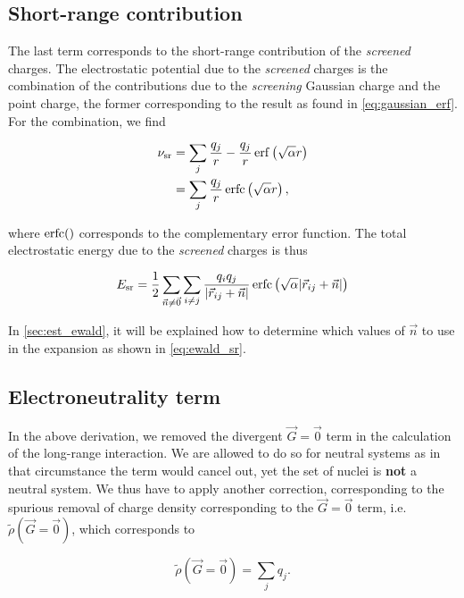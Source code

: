 %
%
%
\subsection{Short-range contribution}

The last term corresponds to the short-range contribution of the \textit{screened} charges. The electrostatic potential due to the \textit{screened} charges is the combination of the contributions due to the \textit{screening} Gaussian charge and the point charge, the former corresponding to the result as found in \cref{eq:gaussian_erf}. For the combination, we find

\begin{align}
    \nu_{\text{sr}} &= \sum_{j} \frac{q_{j}}{r} - \frac{q_{j}}{r} \operatorname{erf} \left( \sqrt{\alpha} r \right) \\
    &= \sum_{j} \frac{q_{j}}{r} \operatorname{erfc} \left( \sqrt{\alpha} r \right),
    \label{eq:nu_shortrange}
\end{align}

where $\operatorname{erfc}()$ corresponds to the complementary error function. The total electrostatic energy due to the \textit{screened} charges is thus

\begin{equation}
    E_{\text{sr}} = \frac{1}{2} \sum_{\vec{n} \neq \vec{0}} \sum_{i \neq j} \frac{q_{i}q_{j}}{|\vec{r}_{ij} + \vec{n}|} \operatorname{erfc} \left( 
\sqrt{\alpha} |\vec{r}_{ij} + \vec{n}| \right)
\label{eq:ewald_sr}
\end{equation}

In \cref{sec:est_ewald}, it will be explained how to determine which values of $\vec{n}$ to use in the expansion as shown in \cref{eq:ewald_sr}.

%
%
%
\subsection{Electroneutrality term}
\label{sec:electroneutrality}

In the above derivation, we removed the divergent $\vec{G}=\vec{0}$ term in the calculation of the long-range interaction. We are allowed to do so for neutral systems as in that circumstance the term would cancel out, yet the set of nuclei is \textbf{not} a neutral system. We thus have to apply another correction, corresponding to the spurious removal of charge density corresponding to the $\vec{G}=\vec{0}$ term, i.e. $\tilde{\rho}(\vec{G}=\vec{0})$, which corresponds to

\begin{equation}
    \tilde{\rho}(\vec{G}=\vec{0}) = \sum_{j}q_{j}.
\end{equation}

